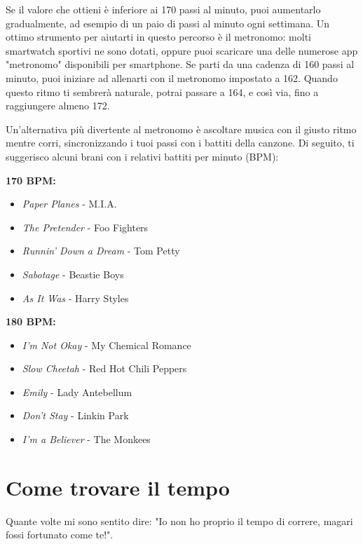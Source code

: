 Se il valore che ottieni è inferiore ai 170 passi al minuto,
puoi aumentarlo gradualmente,
ad esempio di un paio di passi al minuto ogni settimana.
Un ottimo strumento per aiutarti in questo percorso è il metronomo:
molti smartwatch sportivi ne sono dotati,
oppure puoi scaricare una delle numerose app "metronomo" disponibili per smartphone.
Se parti da una cadenza di 160 passi al minuto,
puoi iniziare ad allenarti con il metronomo impostato a 162.
Quando questo ritmo ti sembrerà naturale, potrai passare a 164, e così via,
fino a raggiungere almeno 172.

Un'alternativa più divertente al metronomo è ascoltare musica con il giusto ritmo
mentre corri,
sincronizzando i tuoi passi con i battiti della canzone.
Di seguito, ti suggerisco alcuni brani con i relativi battiti per minuto (BPM):

\vspace{10pt}

\textbf{170 BPM:}

\begin{itemize}
\item \emph{Paper Planes} - M.I.A.
\item \emph{The Pretender} - Foo Fighters
\item \emph{Runnin’ Down a Dream} - Tom Petty
\item \emph{Sabotage} - Beastie Boys
\item \emph{As It Was} - Harry Styles
\end{itemize}

\vspace{10pt}

\textbf{180 BPM:}

\begin{itemize}
\item \emph{I’m Not Okay} - My Chemical Romance
\item \emph{Slow Cheetah} - Red Hot Chili Peppers
\item \emph{Emily} - Lady Antebellum
\item \emph{Don’t Stay} - Linkin Park
\item \emph{I’m a Believer} - The Monkees
\end{itemize}


\chapter{Come trovare il tempo}

Quante volte mi sono sentito dire: "Io non ho proprio il tempo di correre,
magari fossi fortunato come te!".

